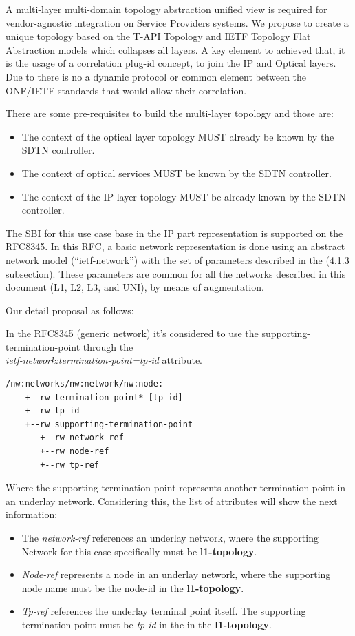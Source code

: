 \documentclass[a4paper,fleqn]{cas-dc}
\begin{document}
A multi-layer multi-domain topology abstraction unified view is required for vendor-agnostic integration on Service Providers systems. We propose to create a unique topology based on the T-API Topology and IETF Topology Flat Abstraction models which collapses all layers. A key element to achieved that, it is the usage of a correlation plug-id concept, to join the IP and Optical layers. Due to there is no a dynamic protocol or common element between the ONF/IETF standards that would allow their correlation. 

There are some pre-requisites to build the multi-layer topology and those are:
\begin{itemize}
    \item The context of the optical layer topology MUST already be known by the SDTN controller.
    \item The context of optical services MUST be known by the SDTN controller.
    \item The context of the IP layer topology MUST be already known by the SDTN controller.
\end{itemize}

The SBI for this use case base in the IP part representation is supported on the RFC8345. In this RFC, a basic network representation is done using an abstract network model (“ietf-network”) with the set of parameters described in the (4.1.3 subsection). These parameters are common for all the networks described in this document (L1, L2, L3, and UNI), by means of augmentation.  

Our detail proposal as follows: 

In the RFC8345 (generic network) it’s considered to use the supporting-termination-point through the
\\ \textit{ietf-network:termination-point={tp-id}} attribute.

\begin{lstlisting}[basicstyle=\ttfamily\small,label=tps,caption=Supporting termination point Structure]
/nw:networks/nw:network/nw:node:
    +--rw termination-point* [tp-id]
    +--rw tp-id 
    +--rw supporting-termination-point
       +--rw network-ref
       +--rw node-ref
       +--rw tp-ref
\end{lstlisting}

Where the supporting-termination-point represents another termination point in an underlay network. Considering this, the list of attributes will show the next information: 
\begin{itemize}
    \item The \textit{network-ref} references an underlay network, where the supporting Network for this case specifically must be \textbf{l1-topology}.
    \item \textit{Node-ref} represents a node in an underlay network, where the supporting node name must be the node-id in the \textbf{l1-topology}.
    \item \textit{Tp-ref} references the underlay terminal point itself. The supporting termination point must be \textit{tp-id} in the in the \textbf{l1-topology}.
\end{itemize}
\end{document}

